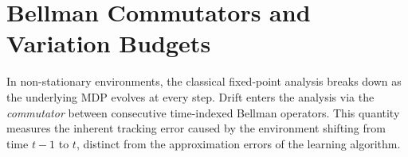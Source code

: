 \documentclass{article}
\theoremstyle{plain}
\newtheorem{lemma}[theorem]{Lemma}
\theoremstyle{definition}
\newtheorem{definition}[theorem]{Definition}
\theoremstyle{remark}
\newcommand{\E}{\mathbb{E}}
\newcommand{\1}{\mathbbm{1}}
\newcommand{\TV}{\mathrm{TV}}
\begin{document}




\section{Bellman Commutators and Variation Budgets}
\label{sec:commutators}

In non-stationary environments, the classical fixed-point analysis breaks down as the underlying MDP evolves at every step. Drift enters the analysis via the \textit{commutator} between consecutive time-indexed Bellman operators. This quantity measures the inherent tracking error caused by the environment shifting from time $t-1$ to $t$, distinct from the approximation errors of the learning algorithm.
\end{document}
